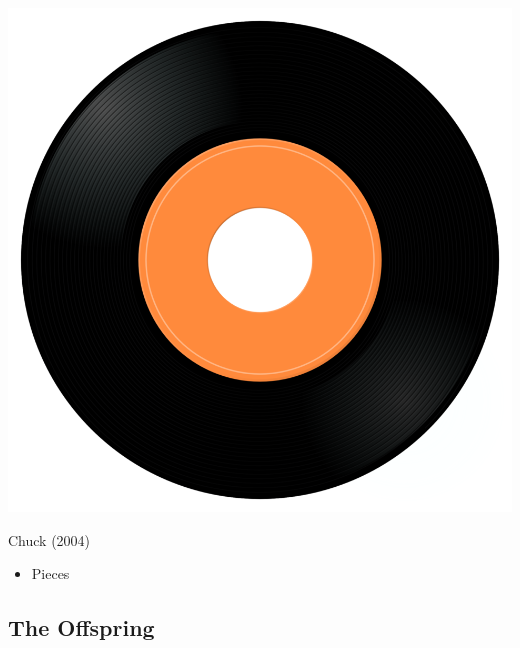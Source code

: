 \begin{minipage}[t]{0.25\textwidth}
\captionsetup{type=figure}
\includegraphics[width=\textwidth]{Images/cover.png}
\caption*{Chuck (2004)}
\end{minipage}
\begin{minipage}[t]{0.25\textwidth}\vspace{0pt}
\begin{itemize}[nosep,leftmargin=1em,labelwidth=*,align=left]
	\setlength{\itemsep}{0pt}
	\item Pieces
\end{itemize}
\end{minipage}

\subsection{The Offspring}

